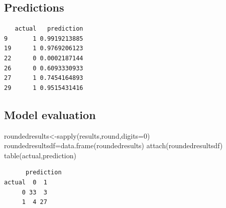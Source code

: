 \documentclass[
  letterpaper,
  DIV=11,
  numbers=noendperiod]{scrartcl}
\newenvironment{Shaded}{\begin{snugshade}}{\end{snugshade}}
\newcommand{\AttributeTok}[1]{\textcolor[rgb]{0.40,0.45,0.13}{#1}}
\newcommand{\DecValTok}[1]{\textcolor[rgb]{0.68,0.00,0.00}{#1}}
\newcommand{\FunctionTok}[1]{\textcolor[rgb]{0.28,0.35,0.67}{#1}}
\newcommand{\NormalTok}[1]{\textcolor[rgb]{0.00,0.23,0.31}{#1}}
\newcommand{\OtherTok}[1]{\textcolor[rgb]{0.00,0.23,0.31}{#1}}
\newcommand{\SpecialCharTok}[1]{\textcolor[rgb]{0.37,0.37,0.37}{#1}}
\newcommand{\StringTok}[1]{\textcolor[rgb]{0.13,0.47,0.30}{#1}}
\begin{document}
\hypertarget{predictions}{%
\subsection{Predictions}\label{predictions}}

\begin{Shaded}
\end{Shaded}

\begin{verbatim}
   actual   prediction
9       1 0.9919213885
19      1 0.9769206123
22      0 0.0002187144
26      0 0.6093330933
27      1 0.7454164893
29      1 0.9515431416
\end{verbatim}

\hypertarget{model-evaluation}{%
\subsection{Model evaluation}\label{model-evaluation}}

\begin{Shaded}
\begin{Highlighting}[]
\NormalTok{roundedresults}\OtherTok{\textless{}{-}}\FunctionTok{sapply}\NormalTok{(results,round,}\AttributeTok{digits=}\DecValTok{0}\NormalTok{)}
\NormalTok{roundedresultsdf}\OtherTok{=}\FunctionTok{data.frame}\NormalTok{(roundedresults)}
\FunctionTok{attach}\NormalTok{(roundedresultsdf)}
\FunctionTok{table}\NormalTok{(actual,prediction)}
\end{Highlighting}
\end{Shaded}

\begin{verbatim}
      prediction
actual  0  1
     0 33  3
     1  4 27
\end{verbatim}
\end{document}
